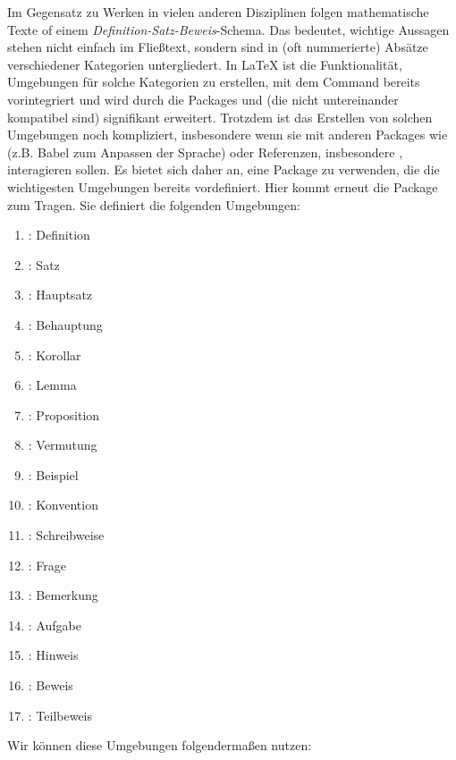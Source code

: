 Im Gegensatz zu Werken in vielen anderen Disziplinen folgen mathematische Texte of einem \emph{Definition-Satz-Beweis}-Schema.
Das bedeutet, wichtige Aussagen stehen nicht einfach im Fließtext, sondern sind in (oft nummerierte) Absätze verschiedener Kategorien untergliedert.
In \LaTeX{} ist die Funktionalität, Umgebungen für solche Kategorien zu erstellen, mit dem Command  bereits vorintegriert und wird durch die Packages  und  (die nicht untereinander kompatibel sind) signifikant erweitert.
Trotzdem ist das Erstellen von solchen Umgebungen noch kompliziert, insbesondere wenn sie mit anderen Packages wie (z.B. Babel zum Anpassen der Sprache) oder Referenzen, insbesondere , interagieren sollen.
Es bietet sich daher an, eine Package zu verwenden, die die wichtigesten Umgebungen bereits vordefiniert.
Hier kommt erneut die Package  zum Tragen.
Sie definiert die folgenden Umgebungen:
\begin{enumerate}
	\item {}: Definition
	\item {}: Satz
	\item {}: Hauptsatz
	\item {}: Behauptung
	\item {}: Korollar
	\item {}: Lemma
	\item {}: Proposition
	\item {}: Vermutung
	\item {}: Beispiel
	\item {}: Konvention
	\item {}: Schreibweise
	\item {}: Frage
	\item {}: Bemerkung
	\item {}: Aufgabe
	\item {}: Hinweis
	\item {}: Beweis
	\item {}: Teilbeweis
\end{enumerate}
Wir können diese Umgebungen folgendermaßen nutzen:
